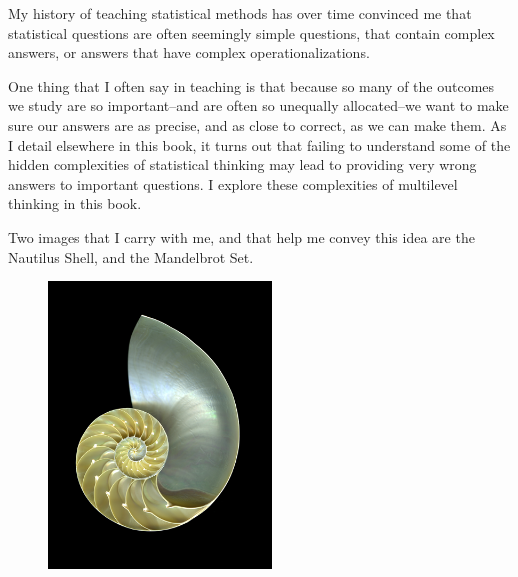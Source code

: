 \documentclass[
  letterpaper,
  DIV=11,
  numbers=noendperiod]{scrreprt}
\begin{document}
\begin{tcolorbox}[enhanced jigsaw, bottomtitle=1mm, breakable, bottomrule=.15mm, colbacktitle=quarto-callout-tip-color!10!white, opacityback=0, colback=white, arc=.35mm, coltitle=black, rightrule=.15mm, leftrule=.75mm, titlerule=0mm, toprule=.15mm, colframe=quarto-callout-tip-color-frame, toptitle=1mm, title=\textcolor{quarto-callout-tip-color}{\faLightbulb}\hspace{0.5em}{Complex Answers Hidden Inside Simple Questions}, left=2mm, opacitybacktitle=0.6]

My history of teaching statistical methods has over time convinced me
that statistical questions are often seemingly simple questions, that
contain complex answers, or answers that have complex
operationalizations.

One thing that I often say in teaching is that because so many of the
outcomes we study are so important--and are often so unequally
allocated--we want to make sure our answers are as precise, and as close
to correct, as we can make them. As I detail elsewhere in this book, it
turns out that failing to understand some of the hidden complexities of
statistical thinking may lead to providing very wrong answers to
important questions. I explore these complexities of multilevel thinking
in this book.

Two images that I carry with me, and that help me convey this idea are
the Nautilus Shell, and the Mandelbrot Set.

\begin{figure}[H]

\begin{minipage}{0.50\linewidth}

\includegraphics[width=\textwidth,height=3in]{nautilus-new.png}

\end{minipage}%
%
\begin{minipage}{0.50\linewidth}


\end{minipage}
\end{figure}
\end{tcolorbox}
\end{document}
